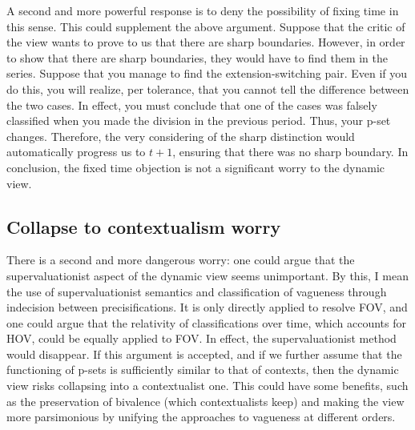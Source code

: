 A second and more powerful response is to deny the possibility of fixing
time in this sense. This could supplement the above argument. Suppose
that the critic of the view wants to prove to us that there are sharp
boundaries. However, in order to show that there are sharp boundaries,
they would have to find them in the series. Suppose that you manage to
find the extension-switching pair. Even if you do this, you will
realize, per tolerance, that you cannot tell the difference between the
two cases. In effect, you must conclude that one of the cases was
falsely classified when you made the division in the previous period.
Thus, your p-set changes. Therefore, the very considering of the sharp
distinction would automatically progress us to $t+1$, ensuring that there
was no sharp boundary. In conclusion, the fixed time objection is not a
significant worry to the dynamic view.

\subsection{Collapse to contextualism worry}

There is a second and more dangerous worry: one could argue that the
supervaluationist aspect of the dynamic view seems unimportant. By this,
I mean the use of supervaluationist semantics and classification of
vagueness through indecision between precisifications. It is only
directly applied to resolve FOV, and one could argue that the relativity
of classifications over time, which accounts for HOV, could be equally
applied to FOV. In effect, the supervaluationist method would disappear.
If this argument is accepted, and if we further assume that the
functioning of p-sets is sufficiently similar to that of contexts, then
the dynamic view risks collapsing into a contextualist one. This could
have some benefits, such as the preservation of bivalence (which
contextualists keep) and making the view more parsimonious by unifying
the approaches to vagueness at different orders.

